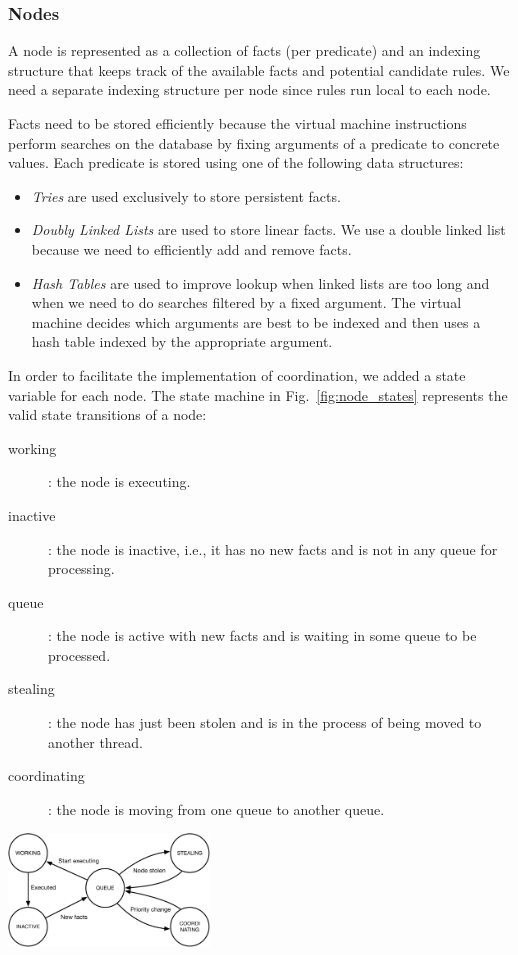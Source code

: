 \subsubsection{Nodes}

A node is represented as a collection of facts (per predicate) and an indexing structure that
keeps track of the available facts and potential candidate rules. We need
a separate indexing structure per node since rules run local to each node.

Facts need to be stored efficiently because the virtual machine instructions
perform searches on the database by fixing arguments of a predicate to concrete
values. Each predicate is stored using one of the following data structures:

\begin{itemize}
\item \emph{Tries} are used exclusively to store persistent facts.
\item \emph{Doubly Linked Lists} are used to store 
  linear facts. We use a double linked list because we need to efficiently add
  and remove facts.
\item \emph{Hash Tables} are used to improve lookup when 
  linked lists are too long and when we need to do searches filtered by
  a fixed argument. The virtual machine decides which arguments are
  best to be indexed and then uses a hash table
  indexed by the appropriate argument.
\end{itemize}

In order to facilitate the implementation of coordination, we added a state
variable for each node. The state machine in
Fig.~\ref{fig:node_states} represents the valid state transitions of a node:

\begin{description}
   \item[working]: the node is executing.
   \item[inactive]: the node is inactive, i.e., it has no new facts and is not in any
   queue for processing.
   \item[queue]: the node is active with new facts and is waiting in some queue
   to be processed.
   \item[stealing]: the node has just been stolen and is in the process of being
   moved to another thread.
   \item[coordinating]: the node is moving from one queue to another queue.
\end{description}

\begin{topfig}
   \centering
   \includegraphics[width=0.4\textwidth]{node_states.pdf}
\end{topfig}

